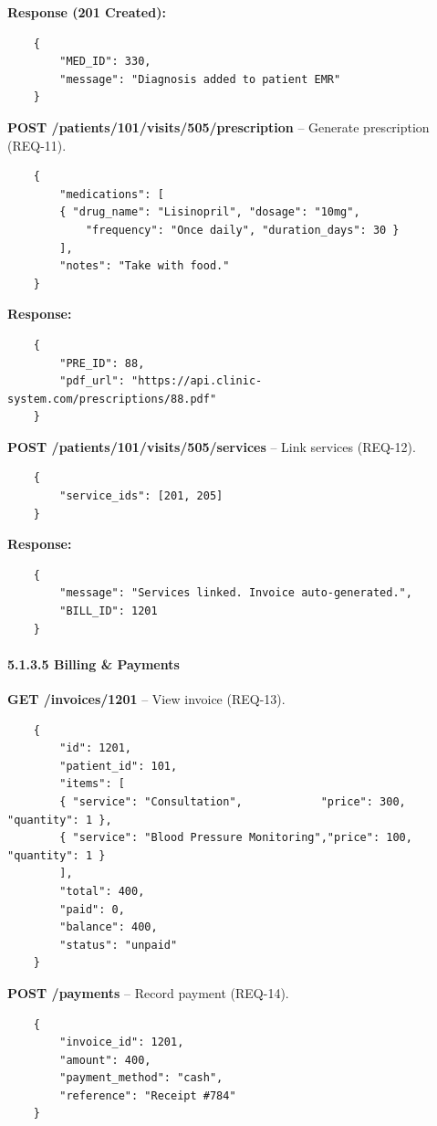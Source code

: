 \textbf{Response (201 Created):}
\begin{verbatim}
	{
		"MED_ID": 330,
		"message": "Diagnosis added to patient EMR"
	}
\end{verbatim}

\medskip
\textbf{POST /patients/101/visits/505/prescription} – Generate prescription (REQ-11).

\begin{verbatim}
	{
		"medications": [
		{ "drug_name": "Lisinopril", "dosage": "10mg",
			"frequency": "Once daily", "duration_days": 30 }
		],
		"notes": "Take with food."
	}
\end{verbatim}

\textbf{Response:}
\begin{verbatim}
	{
		"PRE_ID": 88,
		"pdf_url": "https://api.clinic-system.com/prescriptions/88.pdf"
	}
\end{verbatim}

\medskip
\textbf{POST /patients/101/visits/505/services} – Link services (REQ-12).

\begin{verbatim}
	{
		"service_ids": [201, 205]
	}
\end{verbatim}

\textbf{Response:}
\begin{verbatim}
	{
		"message": "Services linked. Invoice auto-generated.",
		"BILL_ID": 1201
	}
\end{verbatim}

\paragraph{5.1.3.5 \quad Billing \& Payments}

\textbf{GET /invoices/1201} – View invoice (REQ-13).

\begin{verbatim}
	{
		"id": 1201,
		"patient_id": 101,
		"items": [
		{ "service": "Consultation",            "price": 300, "quantity": 1 },
		{ "service": "Blood Pressure Monitoring","price": 100, "quantity": 1 }
		],
		"total": 400,
		"paid": 0,
		"balance": 400,
		"status": "unpaid"
	}
\end{verbatim}

\medskip
\textbf{POST /payments} – Record payment (REQ-14).

\begin{verbatim}
	{
		"invoice_id": 1201,
		"amount": 400,
		"payment_method": "cash",
		"reference": "Receipt #784"
	}
\end{verbatim}


